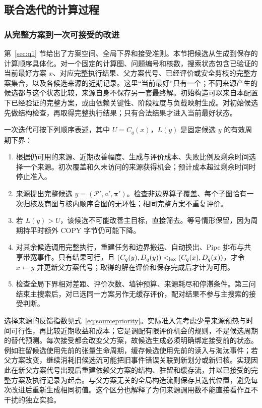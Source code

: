 \subsection{联合迭代的计算过程}
\subsubsection{从完整方案到一次可接受的改进}
第~\ref{sec:q1} 节给出了方案空间、全局下界和接受准则。本节把候选从生成到保存的计算顺序具体化。对一个固定的计算图、问题编号和核数，搜索状态包含已验证的当前最好方案 $x$、对应完整执行结果、父方案代号、已经评价或安全剪枝的完整方案集合，以及各候选来源的近期记录。这里“当前最好”只有一个；不同来源产生的候选都与这个状态比较，来源自身不保存另一套最终解。初始构造可以来自本配置下已经验证的完整方案，或由依赖关键性、阶段粒度与负载映射生成。对初始候选先做结构检查，再取得完整执行结果；只有合法结果才进入当前最好状态。

一次迭代可按下列顺序表述，其中 $U=C_q(x)$，$L(y)$ 是固定候选 $y$ 的有效周期下界：
\begin{enumerate}
  \item 根据仍可用的来源、近期改善幅度、生成与评价成本、失败比例及剩余时间选择一个来源。初次覆盖和久未访问的来源获得机会；预计成本超过剩余时间时停止准入。
  \item 来源提出完整候选 $y=(\mathcal P',a',\boldsymbol\pi')$。检查非边界算子覆盖、每个子图恰有一次归核及商图与核内顺序合图的无环性；相同完整方案不重复评价。
  \item 若 $L(y)>U$，该候选不可能改善主目标，直接筛去。等号情形保留，因为周期持平时额外 COPY 字节仍可能下降。
  \item 对其余候选调用完整执行，重建任务和边界搬运、自动换出、Pipe 排布与共享带宽事件。只有结果可行，且 $(C_q(y),D_q(y))<_{\rm lex}(C_q(x),D_q(x))$，才令 $x\leftarrow y$ 并更新父方案代号；取得的解在评价和保存完成后才计为可用。
  \item 检查全局下界相对差距、评价次数、墙钟预算、来源耗尽和停滞条件。第三问结束主搜索后，对已选同一方案另作无缓存评价，配对结果不参与主搜索的接受判断。
\end{enumerate}
选择来源的反馈指数见式~\eqref{eq:sourcepriority}。实际准入先考虑少量来源预热与时间可行性，再比较近期收益和成本；它是调配有限评价机会的规则，不是候选周期的替代预测。每次接受都会改变父方案，故候选生成必须明确绑定接受前的状态。例如驻留候选使用先前的张量生命周期，缓存候选使用先前的读入与淘汰事件；若父方案改变，继续消耗旧候选流可能把旧事件错误关联到新划分或新归核。实现因此在新父方案代号出现后重建依赖父方案的结构、驻留和缓存流，并以已接受的完整方案及执行记录为起点。与父方案无关的全局构造流则保存其迭代位置，避免每次改进后重新生成相同初值。这个区分也解释了为何来源调用数不能直接看作互不干扰的独立实验。

